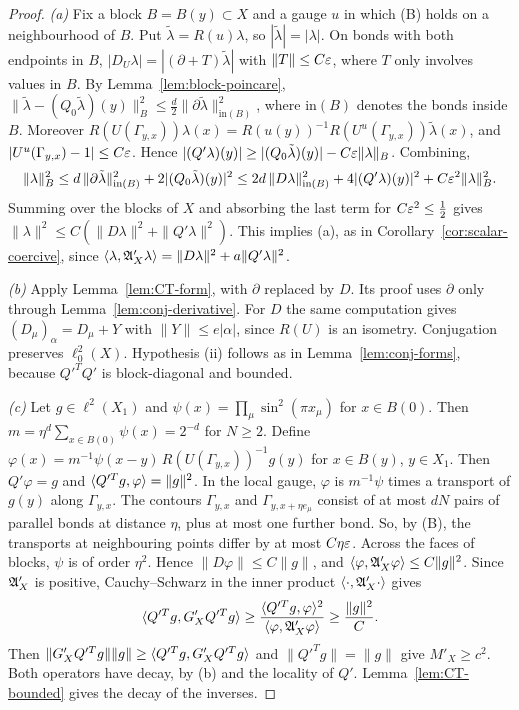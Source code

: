 \begin{proof}
\emph{(a)} Fix a block $B=B(y)\subset X$ and a gauge $u$ in which (B) holds on a neighbourhood of $B$. Put $\tilde\lambda=R(u)\lambda$, so $|\tilde\lambda|=|\lambda|$. On bonds with both endpoints in $B$, $|D_U\lambda|=|(\partial+T)\tilde\lambda|$ with $\|T\|\le C\varepsilon$, where $T$ only involves values in $B$. By Lemma~\ref{lem:block-poincare}, $\|\tilde\lambda-(Q_0\tilde\lambda)(y)\|_B^2\le\frac d2\|\partial\tilde\lambda\|^2_{\mathrm{in}(B)}$, where $\mathrm{in}(B)$ denotes the bonds inside $B$. Moreover $R(U(\Gamma_{y,x}))\lambda(x)=R(u(y))^{-1}R(U^u(\Gamma_{y,x}))\tilde\lambda(x)$, and $|U^u(\Gamma_{y,x})-1|\le C\varepsilon$. Hence $|(Q'\lambda)(y)|\ge|(Q_0\tilde\lambda)(y)|-C\varepsilon\|\lambda\|_B$. Combining,
\[
\|\lambda\|_B^2\le d\,\|\partial\tilde\lambda\|^2_{\mathrm{in}(B)}+2|(Q_0\tilde\lambda)(y)|^2\le2d\,\|D\lambda\|^2_{\mathrm{in}(B)}+4|(Q'\lambda)(y)|^2+C\varepsilon^2\|\lambda\|_B^2 .
\]
Summing over the blocks of $X$ and absorbing the last term for $C\varepsilon^2\le\frac12$ gives $\|\lambda\|^2\le C(\|D\lambda\|^2+\|Q'\lambda\|^2)$. This implies (a), as in Corollary~\ref{cor:scalar-coercive}, since $\langle \lambda,\mathfrak A'_X\lambda\rangle=\|D\lambda\|^2+a\|Q'\lambda\|^2$.

\emph{(b)} Apply Lemma~\ref{lem:CT-form}, with $\partial$ replaced by $D$. Its proof uses $\partial$ only through Lemma~\ref{lem:conj-derivative}. For $D$ the same computation gives $(D_\mu)_\alpha=D_\mu+Y$ with $\|Y\|\le e|\alpha|$, since $R(U)$ is an isometry. Conjugation preserves $\ell^2_0(X)$. Hypothesis (ii) follows as in Lemma~\ref{lem:conj-forms}, because $Q'^TQ'$ is block-diagonal and bounded.

\emph{(c)} Let $g\in\ell^2(X_1)$ and $\psi(x)=\prod_\mu\sin^2(\pi x_\mu)$ for $x\in B(0)$. Then $m=\eta^d\sum_{x\in B(0)}\psi(x)=2^{-d}$ for $N\ge2$. Define $\varphi(x)=m^{-1}\psi(x-y)\,R(U(\Gamma_{y,x}))^{-1}g(y)$ for $x\in B(y)$, $y\in X_1$. Then $Q'\varphi=g$ and $\langle Q'^Tg,\varphi\rangle=\|g\|^2$. In the local gauge, $\varphi$ is $m^{-1}\psi$ times a transport of $g(y)$ along $\Gamma_{y,x}$. The contours $\Gamma_{y,x}$ and $\Gamma_{y,x+\eta e_\mu}$ consist of at most $dN$ pairs of parallel bonds at distance $\eta$, plus at most one further bond. So, by (B), the transports at neighbouring points differ by at most $C\eta\varepsilon$. Across the faces of blocks, $\psi$ is of order $\eta^2$. Hence $\|D\varphi\|\le C\|g\|$, and $\langle \varphi,\mathfrak A'_X\varphi\rangle\le C\|g\|^2$. Since $\mathfrak A'_X$ is positive, Cauchy--Schwarz in the inner product $\langle \cdot,\mathfrak A'_X\cdot\rangle$ gives
\[
\langle Q'^Tg,G'_XQ'^Tg\rangle\ge\frac{\langle Q'^Tg,\varphi\rangle^2}{\langle \varphi,\mathfrak A'_X\varphi\rangle}\ge\frac{\|g\|^2}C .
\]
Then $\|G'_XQ'^Tg\|\|g\|\ge\langle Q'^Tg,G'_XQ'^Tg\rangle$ and $\|Q'^Tg\|=\|g\|$ give $M'_X\ge c^2$. Both operators have decay, by (b) and the locality of $Q'$. Lemma~\ref{lem:CT-bounded} gives the decay of the inverses.


\end{proof}
